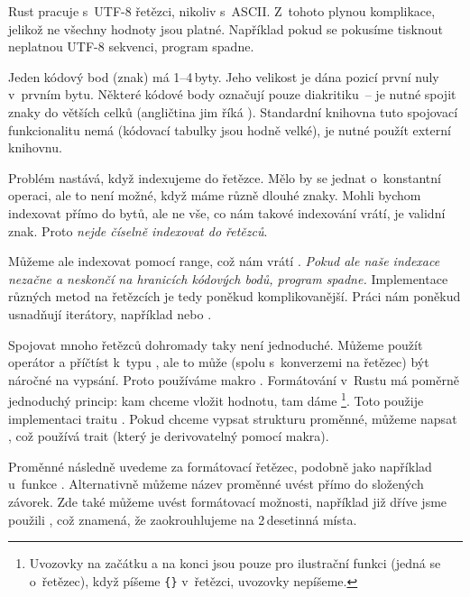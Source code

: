 \documentclass[main.tex]{subfiles}
\begin{document}

Rust pracuje s~UTF-8 řetězci, nikoliv s~ASCII. Z~tohoto plynou komplikace, jelikož ne
všechny hodnoty jsou platné. Například pokud se pokusíme tisknout neplatnou UTF-8
sekvenci, program spadne.


Jeden kódový bod (znak) má 1--4\,byty. Jeho velikost je dána pozicí první nuly v~prvním
bytu. Některé kódové body označují pouze diakritiku~-- je nutné spojit znaky do větších
celků (angličtina jim říká ). Standardní knihovna tuto spojovací
funkcionalitu nemá (kódovací tabulky jsou hodně velké), je nutné použít externí knihovnu.
\cite[sekce\,8.2]{thebook}


Problém nastává, když indexujeme do řetězce. Mělo by se jednat o~konstantní operaci, ale
to není možné, když máme různě dlouhé znaky. Mohli bychom indexovat přímo do bytů, ale ne
vše, co nám takové indexování vrátí, je validní znak. Proto
\emph{nejde číselně indexovat do řetězců}.

Můžeme ale indexovat pomocí range, což nám vrátí . \emph{Pokud ale naše
    indexace nezačne a neskončí na hranicích kódových bodů, program spadne.} Implementace
různých metod na řetězcích je tedy poněkud komplikovanější. Práci nám poněkud usnadňují
iterátory, například  nebo . \cite[sekce\,8.2]{thebook}


Spojovat mnoho řetězců dohromady taky není jednoduché. Můžeme použít \irust{+} operátor a
příčtíst  k~typu , ale to může (spolu s~konverzemi na řetězec)
být náročné na vypsání. Proto používáme makro . Formátování v~Rustu má
poměrně jednoduchý princip: kam chceme vložit hodnotu, tam dáme \footnote{
    Uvozovky na začátku a na konci jsou pouze pro ilustrační funkci (jedná se o~řetězec),
    když píšeme \texttt{\{\}} v~řetězci, uvozovky nepíšeme.
}. Toto použije implementaci traitu . Pokud chceme vypsat strukturu
proměnné, můžeme napsat , což používá  trait (který je
derivovatelný pomocí makra). \cite[sekce\,8.2]{thebook}

Proměnné následně uvedeme za formátovací řetězec, podobně jako například u~funkce
. Alternativně můžeme název proměnné uvést přímo do složených závorek. Zde
také můžeme uvést formátovací možnosti, například již dříve jsme použili ,
což znamená, že zaokrouhlujeme na 2\,desetinná místa.
\end{document}
